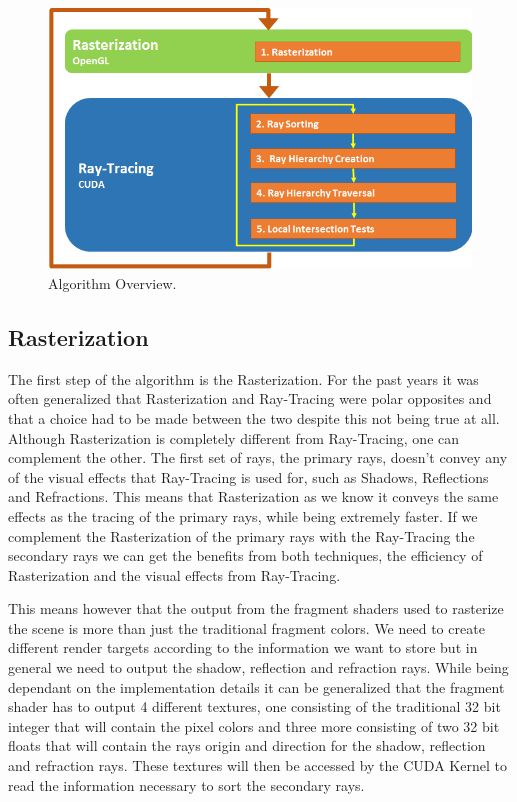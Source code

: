 \documentclass{llncs}
\begin{document}
\begin{figure}
\centering
\includegraphics[scale=0.60]{images/figure 1.png}
\caption{Algorithm Overview.}
\end{figure}

%
\subsection{Rasterization}
%

The first step of the algorithm is the Rasterization. For the past years it was often generalized that Rasterization and Ray-Tracing were polar opposites and that a choice had to be 	made between the two despite this not being true at all. Although Rasterization is completely different from Ray-Tracing, one can complement the other. The first set of rays, the primary rays, doesn't convey any of the visual effects that Ray-Tracing is used for, such as Shadows, Reflections and Refractions. This means that Rasterization as we know it conveys the same effects as the tracing of the primary rays, while being extremely faster. If we complement the Rasterization of the primary rays with the Ray-Tracing the secondary rays we can get the benefits from both techniques, the efficiency of Rasterization and the visual effects from Ray-Tracing.

\medskip

This means however that the output from the fragment shaders used to rasterize the scene is more than just the traditional fragment colors. We need to create different render targets according to the information we want to store but in general we need to output the shadow, reflection and refraction rays. While being dependant on the implementation details it can be generalized that the fragment shader has to output 4 different textures, one consisting of the traditional 32 bit integer that will contain the pixel colors and three more consisting of two 32 bit floats that will contain the rays origin and direction for the shadow, reflection and refraction rays. These textures will then be accessed by the CUDA Kernel to read the information necessary to sort the secondary rays.
\end{document}
